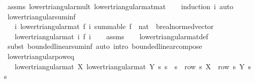\begin{isabellebody}
\ assms\ lower{\isacharunderscore}{\kern0pt}triangular{\isacharunderscore}{\kern0pt}mult\ lower{\isacharunderscore}{\kern0pt}triangular{\isacharunderscore}{\kern0pt}mat{\isacharunderscore}{\kern0pt}mat\isanewline
\ \ \isamarkupfalse%
\ {\isacharparenleft}{\kern0pt}induction\ i{\isacharparenright}{\kern0pt}\ auto%
\endisatagproof
{\isafoldproof}%
%
\isadelimproof
\isanewline
%
\endisadelimproof
\isanewline
{}\isamarkupfalse%
\ lower{\isacharunderscore}{\kern0pt}triangular{\isacharunderscore}{\kern0pt}suminf{\isacharcolon}{\kern0pt}\isanewline
\ \ \ {\isachardoublequoteopen}{\isasymAnd}i{\isachardot}{\kern0pt}\ lower{\isacharunderscore}{\kern0pt}triangular{\isacharunderscore}{\kern0pt}mat\ {\isacharparenleft}{\kern0pt}f\ i{\isacharparenright}{\kern0pt}{\isachardoublequoteclose}\ {\isachardoublequoteopen}summable\ {\isacharparenleft}{\kern0pt}f\ {\isacharcolon}{\kern0pt}{\isacharcolon}{\kern0pt}\ nat\ {\isasymRightarrow}\ {\isacharprime}{\kern0pt}b{\isacharcolon}{\kern0pt}{\isacharcolon}{\kern0pt}real{\isacharunderscore}{\kern0pt}normed{\isacharunderscore}{\kern0pt}vector{\isacharcircum}{\kern0pt}{\isacharunderscore}{\kern0pt}{\isacharcircum}{\kern0pt}{\isacharunderscore}{\kern0pt}{\isacharparenright}{\kern0pt}{\isachardoublequoteclose}\ \isanewline
\ \ \ {\isachardoublequoteopen}lower{\isacharunderscore}{\kern0pt}triangular{\isacharunderscore}{\kern0pt}mat\ {\isacharparenleft}{\kern0pt}{\isasymSum}i{\isachardot}{\kern0pt}\ f\ i{\isacharparenright}{\kern0pt}{\isachardoublequoteclose}\isanewline
%
\isadelimproof
\ \ %
\endisadelimproof
%
\isatagproof
{}\isamarkupfalse%
\ assms\isanewline
\ \ \isamarkupfalse%
\ lower{\isacharunderscore}{\kern0pt}triangular{\isacharunderscore}{\kern0pt}mat{\isacharunderscore}{\kern0pt}def\isanewline
\ \ \isamarkupfalse%
\ {\isacharparenleft}{\kern0pt}subst\ bounded{\isacharunderscore}{\kern0pt}linear{\isachardot}{\kern0pt}suminf{\isacharparenright}{\kern0pt}\ {\isacharparenleft}{\kern0pt}auto\ intro{\isacharcolon}{\kern0pt}\ bounded{\isacharunderscore}{\kern0pt}linear{\isacharunderscore}{\kern0pt}compose{\isacharparenright}{\kern0pt}%
\endisatagproof
{\isafoldproof}%
%
\isadelimproof
\isanewline
%
\endisadelimproof
\isanewline
{}\isamarkupfalse%
\ lower{\isacharunderscore}{\kern0pt}triangular{\isacharunderscore}{\kern0pt}pow{\isacharunderscore}{\kern0pt}eq{\isacharcolon}{\kern0pt}\isanewline
\ \ \ {\isachardoublequoteopen}lower{\isacharunderscore}{\kern0pt}triangular{\isacharunderscore}{\kern0pt}mat\ X{\isachardoublequoteclose}\ {\isachardoublequoteopen}lower{\isacharunderscore}{\kern0pt}triangular{\isacharunderscore}{\kern0pt}mat\ Y{\isachardoublequoteclose}\ {\isachardoublequoteopen}{\isasymAnd}s{\isacharprime}{\kern0pt}{\isachardot}{\kern0pt}\ s{\isacharprime}{\kern0pt}\ {\isasymle}\ s\ {\isasymLongrightarrow}\ row\ s{\isacharprime}{\kern0pt}\ X\ {\isacharequal}{\kern0pt}\ row\ s{\isacharprime}{\kern0pt}\ Y{\isachardoublequoteclose}\ {\isachardoublequoteopen}s{\isacharprime}{\kern0pt}\ {\isasymle}\ s{\isachardoublequoteclose}\isanewline

\end{isabellebody}
